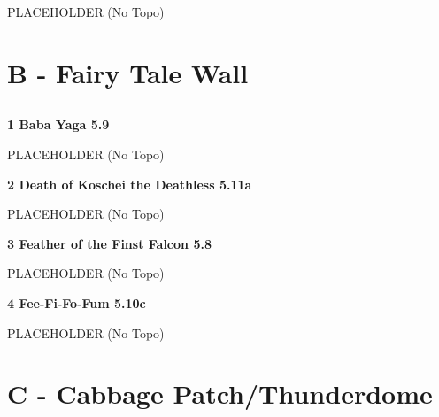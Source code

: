 \begin{multicols}{2}
					\begin{adjustwidth}{0.5cm}{}				
					PLACEHOLDER
						\newline (No Topo) 
					\end{adjustwidth}
\newpage
		\section{B - Fairy Tale Wall}\label{sa:Fairy Tale Wall}
	
	
			\subsection*{}\label{bf:}
						
					\label{rt:Baba Yaga}
\colorbox{green!20}{
\parbox{0.95\linewidth}{
\textbf{
1 Baba Yaga 5.9  
}
}
}

					\begin{adjustwidth}{0.5cm}{}				
					PLACEHOLDER
						\newline (No Topo) 
					\end{adjustwidth}
					\label{rt:Death of Koschei the Deathless}
\colorbox{RoyalBlue!20}{
\parbox{0.95\linewidth}{
\textbf{
2 Death of Koschei the Deathless 5.11a  
}
}
}

					\begin{adjustwidth}{0.5cm}{}				
					PLACEHOLDER
						\newline (No Topo) 
					\end{adjustwidth}
					\label{rt:Feather of the Finst Falcon}
\colorbox{green!20}{
\parbox{0.95\linewidth}{
\textbf{
3 Feather of the Finst Falcon 5.8  
}
}
}

					\begin{adjustwidth}{0.5cm}{}				
					PLACEHOLDER
						\newline (No Topo) 
					\end{adjustwidth}
					\label{rt:Fee-Fi-Fo-Fum}
\colorbox{RoyalBlue!20}{
\parbox{0.95\linewidth}{
\textbf{
4 Fee-Fi-Fo-Fum 5.10c  
}
}
}

					\begin{adjustwidth}{0.5cm}{}				
					PLACEHOLDER
						\newline (No Topo) 
					\end{adjustwidth}
\newpage
		\section{C - Cabbage Patch/Thunderdome}\label{sa:Cabbage Patch/Thunderdome}
	

\end{multicols}
